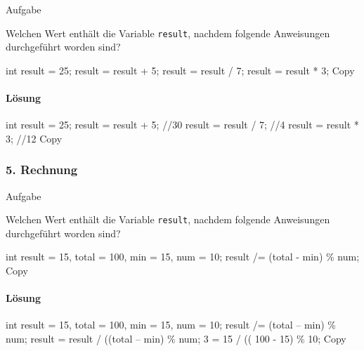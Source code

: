 \documentclass[
]{article}
\newenvironment{Shaded}{}{}
\newcommand{\NormalTok}[1]{#1}
\begin{document}
Aufgabe

Welchen Wert enthält die Variable \texttt{result}, nachdem folgende
Anweisungen durchgeführt worden sind?

\begin{Shaded}
\begin{Highlighting}[]
\NormalTok{int result = 25;  }
\NormalTok{result = result + 5;  }
\NormalTok{result = result / 7;  }
\NormalTok{result = result * 3;  }
\NormalTok{Copy}
\end{Highlighting}
\end{Shaded}

\paragraph{Lösung}\label{luxf6sung-2}

\begin{Shaded}
\begin{Highlighting}[]
\NormalTok{int result = 25;}
\NormalTok{result = result + 5; //30}
\NormalTok{result = result / 7; //4}
\NormalTok{result = result * 3; //12}
\NormalTok{Copy}
\end{Highlighting}
\end{Shaded}

\subsubsection{5. Rechnung}\label{rechnung-1}

Aufgabe

Welchen Wert enthält die Variable \texttt{result}, nachdem folgende
Anweisungen durchgeführt worden sind?

\begin{Shaded}
\begin{Highlighting}[]
\NormalTok{int result = 15, total = 100, min = 15, num = 10;  }
\NormalTok{result /= (total {-} min) \% num;  }
\NormalTok{Copy}
\end{Highlighting}
\end{Shaded}

\paragraph{Lösung}\label{luxf6sung-3}

\begin{Shaded}
\begin{Highlighting}[]
\NormalTok{int result = 15, total = 100, min = 15, num = 10;}
\NormalTok{result /= (total – min) \% num;}
\NormalTok{result = result / ((total – min) \% num;}
\NormalTok{3 = 15 / (( 100 {-} 15) \% 10;}
\NormalTok{Copy}
\end{Highlighting}
\end{Shaded}
\end{document}
